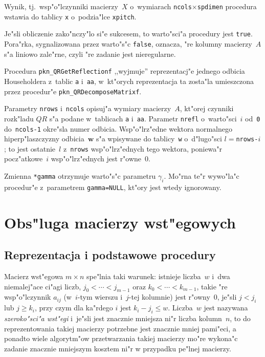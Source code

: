 Wynik, tj.\ wsp"o"lczynniki macierzy~$X$ o~wymiarach
\texttt{ncols}$\times$\texttt{spdimen} procedura wstawia do tablicy
\texttt{x} o~podzia"lce \texttt{xpitch}.

Je"sli obliczenie zako"nczy"lo si"e sukcesem, to warto"sci"a procedury jest
\texttt{true}. Pora"rka, sygnalizowana przez warto"s"c \texttt{false},
oznacza, "re kolumny macierzy~$A$ s"a liniowo zale"rne, czyli "re zadanie
jest nieregularne.

\vspace{\bigskipamount}
Procedura \texttt{pkn\_QRGetReflectionf} ,,wyjmuje'' reprezentacj"e
jednego odbicia Householdera z~tablic \texttt{a} i~\texttt{aa},
w~kt"orych reprezentacja ta zosta"la umieszczona przez procedur"e
\texttt{pkn\_QRDecomposeMatrixf}.

Parametry \texttt{nrows} i~\texttt{ncols} opisuj"a wymiary macierzy~$A$,
kt"orej czynniki rozk"ladu $QR$ s"a podane w~tablicach \texttt{a} i~\texttt{aa}.
Parametr \texttt{nrefl} o~warto"sci~$i$ od~\texttt{0} do~\texttt{ncols-1}
okre"sla numer odbicia. Wsp"o"lrz"edne wektora normalnego hiperp"laszczyzny
odbicia~$\bm{w}$ s"a wpisywane do tablicy~\texttt{w} o~d"lugo"sci
$l=$\texttt{nrows-$i$}; to jest ostatnie~$l$ z~\texttt{nrows} wsp"o"lrz"ednych
tego wektora, poniewa"r pocz"atkowe~$i$ wsp"o"lrz"ednych
jest r"owne~$0$.

Zmienna \texttt{*gamma} otrzymuje warto"s"c parametru $\gamma_i$.
Mo"rna te"r wywo"la"c procedur"e z~parametrem \texttt{gamma=NULL}, kt"ory
jest wtedy ignorowany. 


\newpage
\section{\label{sect:band:matrix}Obs"luga macierzy wst"egowych}

\subsection{\label{ssect:band:basic}Reprezentacja i podstawowe procedury}

Macierz wst"egowa $m\times n$ spe"lnia taki warunek: istnieje liczba~$w$
i~dwa niemalej"ace ci"agi liczb, $j_0<\cdots<j_{m-1}$ oraz
$k_0<\cdots<k_{m-1}$, takie "re wsp"o"lczynnik $a_{ij}$ (w~$i$-tym wierszu
i~$j$-tej kolumnie) jest r"owny~$0$, je"sli $j<j_i$ lub $j\geq k_i$,
przy czym dla ka"rdego $i$ jest $k_i-j_i\leq w$. Liczba~$w$ jest nazywana
\emph{szeroko"sci"a wst"egi} i~je"sli jest znacznie mniejsza ni"r liczba
kolumn~$n$, to do reprezentowania takiej macierzy potrzebne jest znacznie
mniej pami"eci, a ponadto wiele algorytm"ow przetwarzania takiej macierzy
mo"re wykona"c zadanie znacznie mniejszym kosztem ni"r w przypadku pe"lnej
macierzy.

